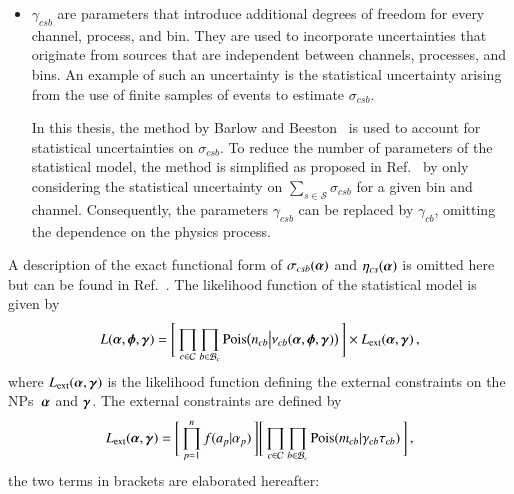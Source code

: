\begin{itemize}
\item $\gamma_{csb}$ are parameters that introduce additional degrees of freedom
  for every channel, process, and bin. They are used to incorporate
  uncertainties that originate from sources that are independent between
  channels, processes, and bins. An example of such an uncertainty is the
  statistical uncertainty arising from the use of finite samples of events to
  estimate $\sigma_{csb}$.

  In this thesis, the method by Barlow and Beeston~\cite{barlow1993} is used to
  account for statistical uncertainties on $\sigma_{csb}$. To reduce the number
  of parameters of the statistical model, the method is simplified as proposed
  in Ref.~\cite{conway2011} by only considering the statistical uncertainty on
  $\sum_{s \in \mathcal{S}} \sigma_{csb}$ for a given bin and
  channel. Consequently, the parameters $\gamma_{csb}$ can be replaced by
  $\gamma_{cb}$, omitting the dependence on the physics process.

\end{itemize}
A description of the exact functional form of $\sigma_{csb}(\myvec{\alpha})$ and
$\eta_{cs}(\myvec{\alpha})$ is omitted here but can be found in
Ref.~\cite{cranmer2012}. The likelihood function of the statistical model is
given by
\begin{align}
  L(\myvec{\alpha}, \myvec{\phi}, \myvec{\gamma}) = \Biggl[\,
  \prod_{c \in \mathcal{C}}
  \prod_{b \in \mathcal{B}_{c}}
  \pois\bigl( n_{cb} \big| \nu_{cb}(\myvec{\alpha}, \myvec{\phi}, \myvec{\gamma}) \bigr)
  \,\Biggr]
  \times L_{\text{ext}}(\myvec{\alpha}, \myvec{\gamma}) \,\text{,}
  \label{eq:likelihood_histfactory}
\end{align}
where $L_{\text{ext}}(\myvec{\alpha}, \myvec{\gamma})$ is the likelihood
function defining the external constraints on the NPs~$\myvec{\alpha}$ and
$\myvec{\gamma}$. The external constraints are defined by
\begin{align*}
  L_{\text{ext}}(\myvec{\alpha}, \myvec{\gamma}) =
  \Biggl[\, \prod_{p=1}^{n} f(a_p \vert \alpha_p)     \,\Biggr]
  \Biggl[\, \prod_{c \in \mathcal{C}} \prod_{b \in \mathcal{B}_{c}} \pois(m_{cb} \vert \gamma_{cb} \tau_{cb}) \,\Biggr] \,\text{,}
\end{align*}
the two terms in brackets are elaborated hereafter:
